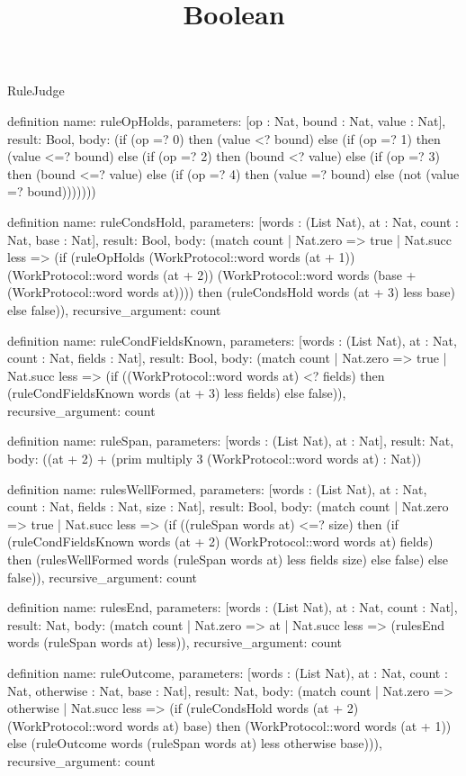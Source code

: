 \begin{lexlean}{RuleJudge}
\title{Boolean}
\begin{semanticmodule}
definition{
  name: ruleOpHolds,
  parameters: [op : Nat, bound : Nat, value : Nat],
  result: Bool,
  body: (if (op =? 0) then (value <? bound) else (if (op =? 1) then (value <=? bound) else (if (op =? 2) then (bound <? value) else (if (op =? 3) then (bound <=? value) else (if (op =? 4) then (value =? bound) else (not (value =? bound)))))))
}

definition{
  name: ruleCondsHold,
  parameters: [words : (List Nat), at : Nat, count : Nat, base : Nat],
  result: Bool,
  body: (match count
    | Nat.zero => true
    | Nat.succ less => (if (ruleOpHolds (WorkProtocol::word words (at + 1)) (WorkProtocol::word words (at + 2)) (WorkProtocol::word words (base + (WorkProtocol::word words at)))) then (ruleCondsHold words (at + 3) less base) else false)),
  recursive_argument: count
}

definition{
  name: ruleCondFieldsKnown,
  parameters: [words : (List Nat), at : Nat, count : Nat, fields : Nat],
  result: Bool,
  body: (match count
    | Nat.zero => true
    | Nat.succ less => (if ((WorkProtocol::word words at) <? fields) then (ruleCondFieldsKnown words (at + 3) less fields) else false)),
  recursive_argument: count
}

definition{
  name: ruleSpan,
  parameters: [words : (List Nat), at : Nat],
  result: Nat,
  body: ((at + 2) + (prim multiply 3 (WorkProtocol::word words at) : Nat))
}

definition{
  name: rulesWellFormed,
  parameters: [words : (List Nat), at : Nat, count : Nat, fields : Nat, size : Nat],
  result: Bool,
  body: (match count
    | Nat.zero => true
    | Nat.succ less => (if ((ruleSpan words at) <=? size) then (if (ruleCondFieldsKnown words (at + 2) (WorkProtocol::word words at) fields) then (rulesWellFormed words (ruleSpan words at) less fields size) else false) else false)),
  recursive_argument: count
}

definition{
  name: rulesEnd,
  parameters: [words : (List Nat), at : Nat, count : Nat],
  result: Nat,
  body: (match count | Nat.zero => at | Nat.succ less => (rulesEnd words (ruleSpan words at) less)),
  recursive_argument: count
}

definition{
  name: ruleOutcome,
  parameters: [words : (List Nat), at : Nat, count : Nat, otherwise : Nat, base : Nat],
  result: Nat,
  body: (match count
    | Nat.zero => otherwise
    | Nat.succ less => (if (ruleCondsHold words (at + 2) (WorkProtocol::word words at) base) then (WorkProtocol::word words (at + 1)) else (ruleOutcome words (ruleSpan words at) less otherwise base))),
  recursive_argument: count
}


\end{semanticmodule}
\end{lexlean}
